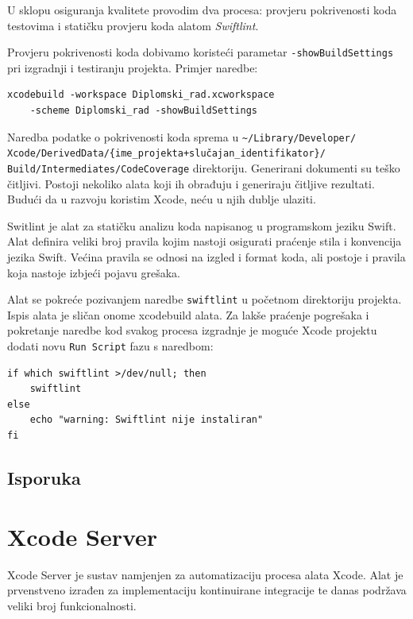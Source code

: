 \documentclass[times, utf8, diplomski, numeric]{fer}
\begin{document}
\begin{appendices}
U sklopu osiguranja kvalitete provodim dva procesa: provjeru pokrivenosti koda testovima i statičku provjeru koda alatom \textit{Swiftlint}.

Provjeru pokrivenosti koda dobivamo koristeći parametar \verb|-showBuildSettings| pri izgradnji i testiranju projekta. Primjer naredbe:

\begin{verbatim}
xcodebuild -workspace Diplomski_rad.xcworkspace
    -scheme Diplomski_rad -showBuildSettings
\end{verbatim}

Naredba podatke o pokrivenosti koda sprema u \verb|~/Library/Developer/|\\\verb|Xcode/DerivedData/{ime_projekta+slučajan_identifikator}/|\\\verb|Build/Intermediates/CodeCoverage| direktoriju. Generirani dokumenti su teško čitljivi. Postoji nekoliko alata koji ih obrađuju i generiraju čitljive rezultati. Budući da u razvoju koristim Xcode, neću u njih dublje ulaziti.

Switlint je alat za statičku analizu koda napisanog u programskom jeziku Swift. Alat definira veliki broj pravila kojim nastoji osigurati praćenje stila i konvencija jezika Swift. Većina pravila se odnosi na izgled i format koda, ali postoje i pravila koja nastoje izbjeći pojavu grešaka.

Alat se pokreće pozivanjem naredbe \verb|swiftlint| u početnom direktoriju projekta. Ispis alata je sličan onome xcodebuild alata. Za lakše praćenje pogrešaka i pokretanje naredbe kod svakog procesa izgradnje je moguće Xcode projektu dodati novu \verb|Run Script| fazu s naredbom:

\begin{verbatim}
if which swiftlint >/dev/null; then
    swiftlint
else
    echo "warning: Swiftlint nije instaliran"
fi
\end{verbatim}

\section{Isporuka}

\chapter{Xcode Server}

Xcode Server je sustav namjenjen za automatizaciju procesa alata Xcode. Alat je prvenstveno izrađen za implementaciju kontinuirane integracije te danas podržava veliki broj funkcionalnosti.


\end{appendices}
\end{document}
